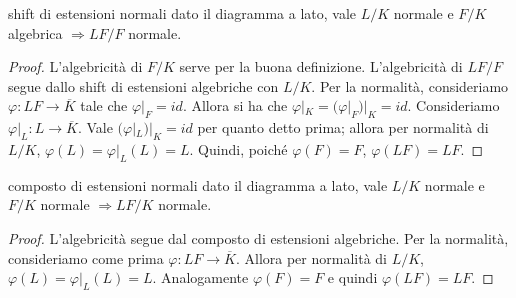 \begin{minipage}{0.1\textwidth}  
\end{minipage}\hfill
\begin{minipage}{0.7\textwidth}
\begin{theorem}{shift di estensioni normali}
    dato il diagramma a lato, vale $L/K$ normale e $F/K$ algebrica $\Rightarrow LF/F$ normale.
\end{theorem}
\begin{proof}
    L'algebricità di $F/K$ serve per la buona definizione. L'algebricità di $LF/F$ segue dallo shift di estensioni algebriche con $L/K$. Per la normalità, consideriamo $\varphi: LF \rightarrow \overline{K}$ tale che $\varphi|_F = id$. Allora si ha che $\varphi|_K =  (\varphi|_F)|_K = id$. Consideriamo $\varphi|_L : L \rightarrow \overline{K}$. Vale $(\varphi|_L)|_K = id$ per quanto detto prima; allora per normalità di $L/K$, $\varphi(L) = \varphi|_L(L) = L$. Quindi, poiché $\varphi(F)= F$, $\varphi(LF) = LF$.
\end{proof}
\end{minipage}\hfill
\begin{minipage}{0.3\textwidth}  
\end{minipage}\hfill
\vspace{0.5cm}
\begin{minipage}{0.7\textwidth}
\begin{theorem}{composto di estensioni normali}
    dato il diagramma a lato, vale $L/K$ normale e $F/K$ normale $\Rightarrow LF/K$ normale.
\end{theorem}
\begin{proof}
    L'algebricità segue dal composto di estensioni algebriche.  Per la normalità, consideriamo come prima $\varphi: LF \rightarrow \overline{K}$. Allora per normalità di $L/K$, $\varphi(L) = \varphi|_L(L) = L$. Analogamente $\varphi(F) = F$ e quindi $\varphi(LF) = LF$.
\end{proof}
\end{minipage}\hfill
\begin{minipage}{0.3\textwidth}  
\end{minipage}\hfill
